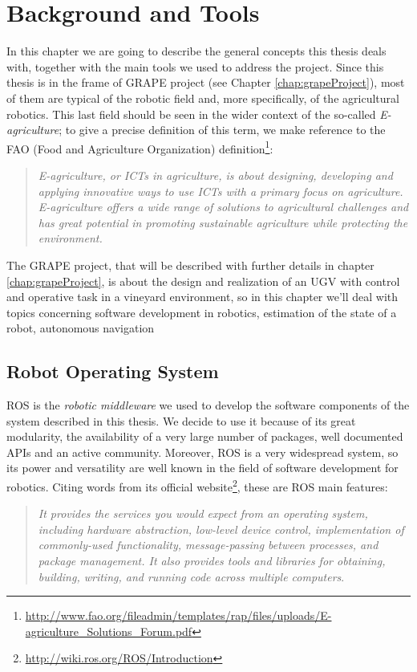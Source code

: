 \chapter{Background and Tools} \label{chap:backgroundAndToolsChapter}

In this chapter we are going to describe the general concepts this thesis deals with, together with the main tools we used to address the project. Since this thesis is in the frame of \ac{GRAPE} project (see Chapter \ref{chap:grapeProject}),  most of them are typical of the robotic field and, more specifically, of the agricultural robotics. This last field should be seen in the wider context of the so-called \textit{E-agriculture}; to give a precise definition of this term, we make reference to the FAO (Food and Agriculture Organization) definition\footnote{\url{http://www.fao.org/fileadmin/templates/rap/files/uploads/E-agriculture\_Solutions\_Forum.pdf}}:
\blockquote{\textit{E-agriculture, or ICTs in agriculture, is about designing,
developing and applying innovative ways to use ICTs with a
primary focus on agriculture. E-agriculture offers a wide range
of solutions to agricultural challenges and has great potential
in promoting sustainable agriculture while protecting the
environment.}}
The \ac{GRAPE} project, that will be described with further details in chapter \ref{chap:grapeProject}, is about the design and realization of an \ac{UGV} with control and operative task in a vineyard environment, so in this chapter we'll deal with topics concerning software development in robotics, estimation of the state of a robot, autonomous navigation


\section{Robot Operating System}\label{sec:robotOperatingSystem}
\ac{ROS} is the \textit{robotic middleware} we used to develop the software components of the system described in this thesis. We decide to use it because of its great modularity, the availability of a very large number of packages, well documented \ac{API}s and an active community. Moreover, \ac{ROS} is a very widespread system, so its power and versatility are well known in the field of software development for robotics. Citing words from its official website\footnote{\url{http://wiki.ros.org/ROS/Introduction}},
these are \ac{ROS} main features: 
\blockquote{
\textit{It provides the services you would expect from an operating system, including hardware abstraction, low-level device control, implementation of commonly-used functionality, message-passing between processes, and package management. It also provides tools and libraries for obtaining, building, writing, and running code across multiple computers}.
} 

